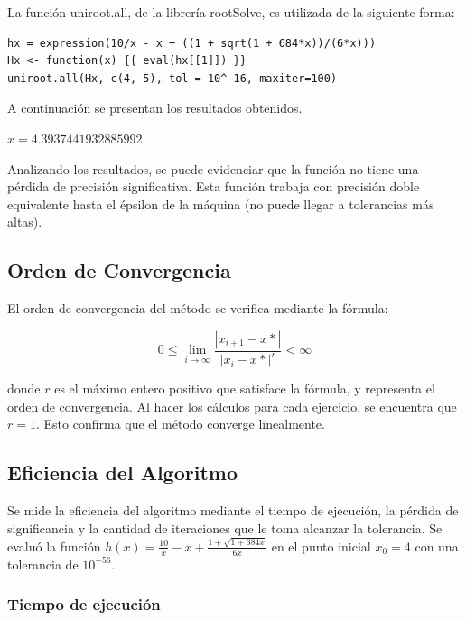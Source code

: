 \documentclass[a4paper,12pt]{article}
\begin{document}
La función uniroot.all, de la librería rootSolve, es utilizada de la siguiente forma: \par

\begin{verbatim}
hx = expression(10/x - x + ((1 + sqrt(1 + 684*x))/(6*x)))
Hx <- function(x) {{ eval(hx[[1]]) }}
uniroot.all(Hx, c(4, 5), tol = 10^-16, maxiter=100)
\end{verbatim}

A continuación se presentan los resultados obtenidos. \par

\vspace{1em}
$x=4.3937441932885992$
\vspace{1em}

Analizando los resultados, se puede evidenciar que la función no tiene una pérdida de precisión significativa. Esta función trabaja con precisión doble equivalente hasta el épsilon de la máquina (no puede llegar a tolerancias más altas). \par

\newpage

\subsection{Orden de Convergencia}

El orden de convergencia del método se verifica mediante la fórmula: \par

\[ 0 \leq \lim_{i\to\infty} \frac{|x_{i+1}-x*|}{|x_i-x*|^r} < \infty \]

donde $r$ es el máximo entero positivo que satisface la fórmula, y representa el orden de convergencia. Al hacer los cálculos para cada ejercicio, se encuentra que $r=1$. Esto confirma que el método converge linealmente. \par

\subsection{Eficiencia del Algoritmo} 

Se mide la eficiencia del algoritmo mediante el tiempo de ejecución, la pérdida de significancia y la cantidad de iteraciones que le toma alcanzar la tolerancia. Se evaluó la función $h(x)=\frac{10}{x}-x +\frac{1 + \sqrt{1 + 684 x}}{6x}$ en el punto inicial $x_0=4$ con una tolerancia de $10^{-56}$. \par 

\subsubsection{Tiempo de ejecución}
\end{document}
